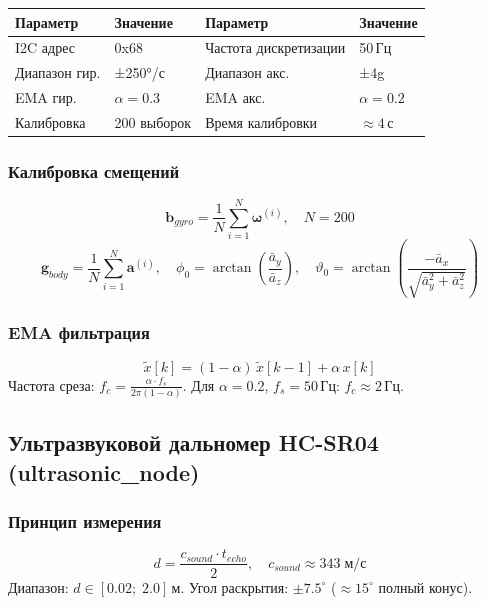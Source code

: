 \documentclass[12pt, a4paper]{article}
\begin{document}
\begin{center}
\begin{tabular}{llll}
\toprule
\textbf{Параметр} & \textbf{Значение} & \textbf{Параметр} & \textbf{Значение} \\
\midrule
I2C адрес     & 0x68           & Частота дискретизации & 50\,Гц \\
Диапазон гир. & ±250°/с        & Диапазон акс.         & ±4g \\
EMA гир.      & $\alpha = 0.3$ & EMA акс.              & $\alpha = 0.2$ \\
Калибровка    & 200 выборок    & Время калибровки      & $\approx 4$\,с \\
\bottomrule
\end{tabular}
\end{center}

\subsubsection{Калибровка смещений}
\begin{equation}
  \mathbf{b}_{gyro} = \frac{1}{N}\sum_{i=1}^{N}\boldsymbol{\omega}^{(i)}, \quad N = 200
\end{equation}
\begin{equation}
  \mathbf{g}_{body} = \frac{1}{N}\sum_{i=1}^{N}\mathbf{a}^{(i)}, \quad
  \phi_0 = \arctan\!\left(\frac{\bar{a}_y}{\bar{a}_z}\right), \quad
  \vartheta_0 = \arctan\!\left(\frac{-\bar{a}_x}{\sqrt{\bar{a}_y^2+\bar{a}_z^2}}\right)
\end{equation}

\subsubsection{EMA фильтрация}
\begin{equation}
  \tilde{x}[k] = (1-\alpha)\,\tilde{x}[k-1] + \alpha\,x[k]
\end{equation}
Частота среза: $f_c = \frac{\alpha \cdot f_s}{2\pi(1-\alpha)}$. Для $\alpha=0.2$, $f_s=50$\,Гц: $f_c \approx 2$\,Гц.

\subsection{Ультразвуковой дальномер HC-SR04 (ultrasonic\_node)}

\subsubsection{Принцип измерения}
\begin{equation}
  d = \frac{c_{sound} \cdot t_{echo}}{2}, \quad c_{sound} \approx 343\;\text{м/с}
\end{equation}
Диапазон: $d \in [0.02;\; 2.0]$\,м. Угол раскрытия: $\pm 7.5^\circ$ ($\approx 15^\circ$ полный конус).
\end{document}
